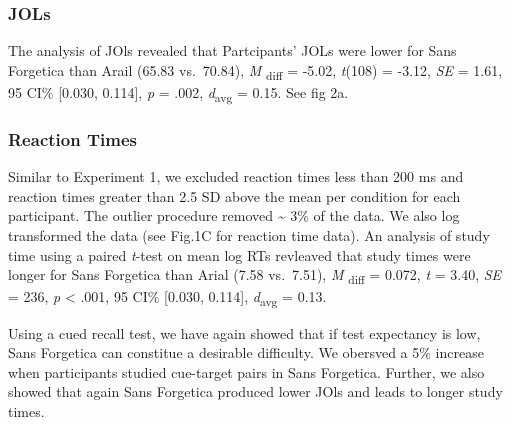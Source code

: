 \documentclass[
  english,
  jou]{apa6}
\begin{document}
\hypertarget{jols-1}{%
\subsubsection{JOLs}\label{jols-1}}

The analysis of JOls revealed that Partcipants' JOLs were lower for Sans Forgetica than Arail (65.83 vs.~70.84), \emph{M} \textsubscript{diff} = -5.02, \emph{t}(108) = -3.12, \emph{SE} = 1.61, 95 CI\% {[}0.030, 0.114{]}, \emph{p} = .002, \emph{d}\textsubscript{avg} = 0.15. See fig 2a.

\hypertarget{reaction-times}{%
\subsubsection{Reaction Times}\label{reaction-times}}

Similar to Experiment 1, we excluded reaction times less than 200 ms and reaction times greater than 2.5 SD above the mean per condition for each participant. The outlier procedure removed \textasciitilde{} 3\% of the data. We also log transformed the data (see Fig.1C for reaction time data). An analysis of study time using a paired \emph{t}-test on mean log RTs revleaved that study times were longer for Sans Forgetica than Arial (7.58 vs.~7.51), \emph{M} \textsubscript{diff} = 0.072, \emph{t} = 3.40, \emph{SE} = 236, \emph{p} \textless{} .001, 95 CI\% {[}0.030, 0.114{]}, \emph{d}\textsubscript{avg} = 0.13.

Using a cued recall test, we have again showed that if test expectancy is low, Sans Forgetica can constitue a desirable difficulty. We obersved a 5\% increase when participants studied cue-target pairs in Sans Forgetica. Further, we also showed that again Sans Forgetica produced lower JOls and leads to longer study times.
\end{document}
